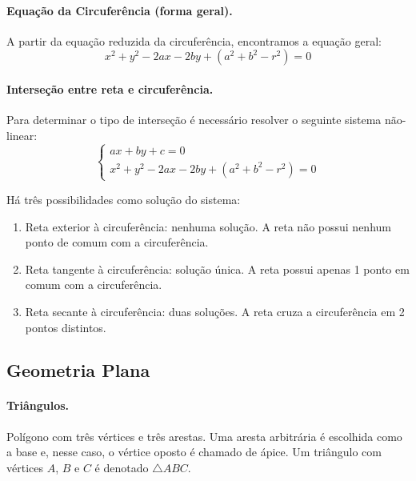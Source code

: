 \paragraph{Equação da Circuferência (forma geral).} A partir da equação reduzida da circuferência, encontramos a equação geral:
		$$x^2 +y^2-2ax-2by+(a^2+b^2-r^2)=0$$

\paragraph{Interseção entre reta e circuferência.} Para determinar o tipo de interseção é necessário resolver o seguinte sistema não-linear: 
$$
\begin{cases}
	ax+by+c = 0 \\
	x^2 +y^2-2ax-2by+(a^2+b^2-r^2)=0
\end{cases}
$$

Há três possibilidades como solução do sistema:
		\begin{enumerate}
			\item Reta exterior à circuferência: nenhuma solução. A reta não possui nenhum ponto de comum com a circuferência.
			\item Reta tangente à circuferência: solução única. A reta possui apenas 1 ponto em comum com a circuferência.
			\item Reta secante à circuferência: duas soluções. A reta cruza a circuferência em 2 pontos distintos.
		\end{enumerate}

\subsection{Geometria Plana}

\paragraph{Triângulos.} Polígono com três vértices e três arestas. Uma aresta arbitrária é escolhida como a base e, nesse caso, o vértice oposto é chamado de ápice. Um triângulo com vértices $A$, $B$ e $C$ é denotado $\triangle ABC$.

